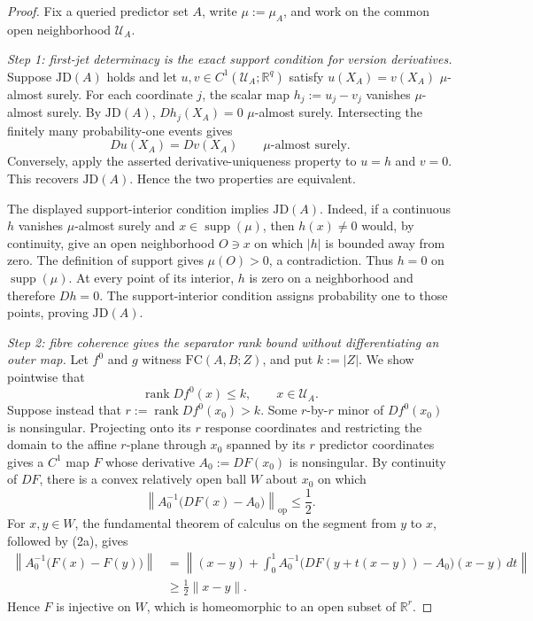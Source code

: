 \documentclass{article}
\begin{document}
\begin{proof}
Fix a queried predictor set \(A\), write \(\mu:=\mu_A\), and work on the common open neighborhood \(\mathcal U_A\).

\emph{Step 1: first-jet determinacy is the exact support condition for version derivatives.}
Suppose \(\mathrm{JD}(A)\) holds and let \(u,v\in C^1(\mathcal U_A;\mathbb R^q)\) satisfy \(u(X_A)=v(X_A)\) \(\mu\)-almost surely.  For each coordinate \(j\), the scalar map \(h_j:=u_j-v_j\) vanishes \(\mu\)-almost surely.  By \(\mathrm{JD}(A)\), \(Dh_j(X_A)=0\) \(\mu\)-almost surely.  Intersecting the finitely many probability-one events gives
\[
 Du(X_A)=Dv(X_A)\qquad\mu\text{-almost surely}. \tag{1}
\]
Conversely, apply the asserted derivative-uniqueness property to \(u=h\) and \(v=0\).  This recovers \(\mathrm{JD}(A)\).  Hence the two properties are equivalent.

The displayed support-interior condition implies \(\mathrm{JD}(A)\).  Indeed, if a continuous \(h\) vanishes \(\mu\)-almost surely and \(x\in\operatorname{supp}(\mu)\), then \(h(x)\neq0\) would, by continuity, give an open neighborhood \(O\ni x\) on which \(|h|\) is bounded away from zero.  The definition of support gives \(\mu(O)>0\), a contradiction.  Thus \(h=0\) on \(\operatorname{supp}(\mu)\).  At every point of its interior, \(h\) is zero on a neighborhood and therefore \(Dh=0\).  The support-interior condition assigns probability one to those points, proving \(\mathrm{JD}(A)\).

\emph{Step 2: fibre coherence gives the separator rank bound without differentiating an outer map.}
Let \(f^0\) and \(g\) witness \(\mathrm{FC}(A,B;Z)\), and put \(k:=|Z|\).  We show pointwise that
\[
 \operatorname{rank}Df^0(x)\leq k,\qquad x\in\mathcal U_A. \tag{2}
\]
Suppose instead that \(r:=\operatorname{rank}Df^0(x_0)>k\).  Some \(r\)-by-\(r\) minor of \(Df^0(x_0)\) is nonsingular.  Projecting onto its \(r\) response coordinates and restricting the domain to the affine \(r\)-plane through \(x_0\) spanned by its \(r\) predictor coordinates gives a \(C^1\) map \(F\) whose derivative \(A_0:=DF(x_0)\) is nonsingular.  By continuity of \(DF\), there is a convex relatively open ball \(W\) about \(x_0\) on which
\[
 \left\|A_0^{-1}\bigl(DF(x)-A_0\bigr)\right\|_{\mathrm{op}}\leq\frac12. \tag{2a}
\]
For \(x,y\in W\), the fundamental theorem of calculus on the segment from \(y\) to \(x\), followed by (2a), gives
\[
 \begin{aligned}
 \left\|A_0^{-1}\bigl(F(x)-F(y)\bigr)\right\|
 &=\left\|(x-y)+\int_0^1 A_0^{-1}\bigl(DF(y+t(x-y))-A_0\bigr)(x-y)\,dt\right\|\\
 &\geq \frac12\|x-y\|.
 \end{aligned} \tag{2b}
\]
Hence \(F\) is injective on \(W\), which is homeomorphic to an open subset of \(\mathbb R^r\).


\end{proof}
\end{document}
